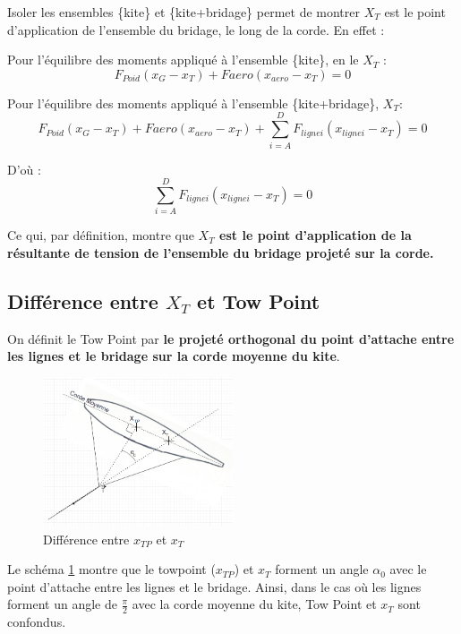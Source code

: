\documentclass[conference]{IEEEtran}
\begin{document}
Isoler les ensembles \{kite\} et \{kite+bridage\} permet de montrer $X_T$ est le point d'application de l'ensemble du bridage, le long de la corde. En effet :

Pour l'équilibre des moments appliqué à l'ensemble \{kite\}, en le $X_T$ :
\begin{equation}
    F_{Poid}(x_G-x_T)+F{aero}(x_{aero}-x_T) = 0
\end{equation}

Pour l'équilibre des moments appliqué à l'ensemble \{kite+bridage\}, $X_T$:
\begin{equation}
    F_{Poid}(x_G-x_T) + F{aero}(x_{aero}-x_T) + \sum_{i=A}^{D} F_{ligne i}(x_{ligne i}-x_T)= 0
\end{equation}

D'où : 
\begin{equation}
    \sum_{i=A}^{D} F_{ligne i}(x_{ligne i}-x_T)= 0
\end{equation}

Ce qui, par définition, montre que \textbf{$X_T$ est le point d'application de la résultante de tension de l'ensemble du bridage projeté sur la corde.}

\subsection{Différence entre $X_T$ et Tow Point}

On définit le Tow Point par \textbf{le projeté orthogonal du point d'attache entre les lignes et le bridage sur la corde moyenne du kite}. 

\begin{figure}[H]
    \centering
    \includegraphics[width=0.5\textwidth]{Pics/xtp.png}  
    \caption{Différence entre $x_{TP}$ et $x_T$}
    \label{fig:Xtp}
\end{figure}

Le schéma \ref{fig:Xtp} montre que le towpoint ($x_{TP}$) et $x_T$ forment un angle $\alpha_0$ avec le point d'attache entre les lignes et le bridage. Ainsi, dans le cas où les lignes forment un angle de $\frac{\pi}{2}$ avec la corde moyenne du kite, Tow Point et $x_T$ sont confondus. 
\end{document}
